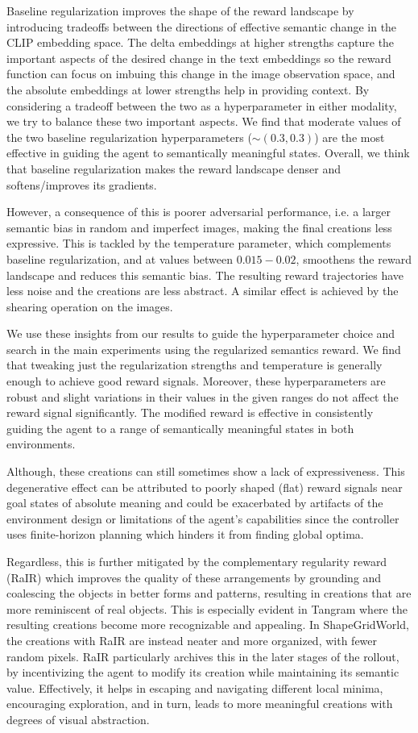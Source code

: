 Baseline regularization improves the shape of the reward landscape by introducing tradeoffs between the directions of effective semantic change in the CLIP embedding space.
The delta embeddings at higher strengths capture the important aspects of the desired change in the text embeddings so the reward function can focus on imbuing this change in the image observation space, and the absolute embeddings at lower strengths help in providing context.
By considering a tradeoff between the two as a hyperparameter in either modality, we try to balance these two important aspects.
We find that moderate values of the two baseline regularization hyperparameters (\(\sim (0.3, 0.3)\)) are the most effective in guiding the agent to semantically meaningful states.
Overall, we think that baseline regularization makes the reward landscape denser and softens/improves its gradients.

However, a consequence of this is poorer adversarial performance, i.e. a larger semantic bias in random and imperfect images, making the final creations less expressive.
This is tackled by the temperature parameter, which complements baseline regularization, and at values between \(0.015 - 0.02\), smoothens the reward landscape and reduces this semantic bias.
The resulting reward trajectories have less noise and the creations are less abstract.
A similar effect is achieved by the shearing operation on the images.

We use these insights from our results to guide the hyperparameter choice and search in the main experiments using the regularized semantics reward.
We find that tweaking just the regularization strengths and temperature is generally enough to achieve good reward signals.
Moreover, these hyperparameters are robust and slight variations in their values in the given ranges do not affect the reward signal significantly.
The modified reward is effective in consistently guiding the agent to a range of semantically meaningful states in both environments.

Although, these creations can still sometimes show a lack of expressiveness.
This degenerative effect can be attributed to poorly shaped (flat) reward signals near goal states of absolute meaning and could be exacerbated by artifacts of the environment design or limitations of the agent's capabilities since the controller uses finite-horizon planning which hinders it from finding global optima.

Regardless, this is further mitigated by the complementary regularity reward (RaIR) which improves the quality of these arrangements by grounding and coalescing the objects in better forms and patterns, resulting in creations that are more reminiscent of real objects.
This is especially evident in Tangram where the resulting creations become more recognizable and appealing.
In ShapeGridWorld, the creations with RaIR are instead neater and more organized, with fewer random pixels.
RaIR particularly archives this in the later stages of the rollout, by incentivizing the agent to modify its creation while maintaining its semantic value.
Effectively, it helps in escaping and navigating different local minima, encouraging exploration, and in turn, leads to more meaningful creations with degrees of visual abstraction.


